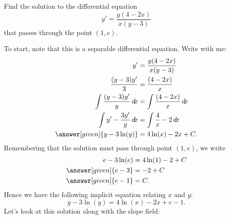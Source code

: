 \documentclass{ximera}
\begin{document}
\begin{example}
  Find the solution to the differential equation
  \[
  y' = \frac{y(4-2x)}{x(y-3)}
  \]
  that passes through the point $(1,e)$.
  \begin{explanation}
    To start, note that this is a separable differential equation. Write with me:
    \begin{align*}
      y' &= \frac{y(4-2x)}{x(y-3)}\\
      \frac{(y-3)y'}{3}&=\frac{(4-2x)}{x}\\
      \int \frac{(y-3)y'}{y}\d x&=\int \frac{(4-2x)}{x}\d x\\
      \int y'-\frac{3y'}{y}\d x&=\int \frac{4}{x}-2\d x\\
      \answer[given]{y-3\ln(y)} &=4\ln(x)-2x+C.
    \end{align*}
    Remembering that the solution must pass through point $(1,e)$, we write
    \begin{align*}
      e-3\ln(e) &=4\ln(1)-2+C\\
      \answer[given]{e-3} &=-2+C\\
      \answer[given]{e-1} &=C.
    \end{align*}
    Hence we have the following implicit equation relating $x$ and $y$:
    \[
    y-3\ln(y) =4\ln(x)-2x+e-1.
    \]
    Let's look at this solution along with the slope field:
    \begin{image}
      {\def\length{sqrt((-3*x+1*x*y)^2+(4*y-2*x*y)^2)}
        }
\end{image}
\end{explanation}
\end{example}
\end{document}
